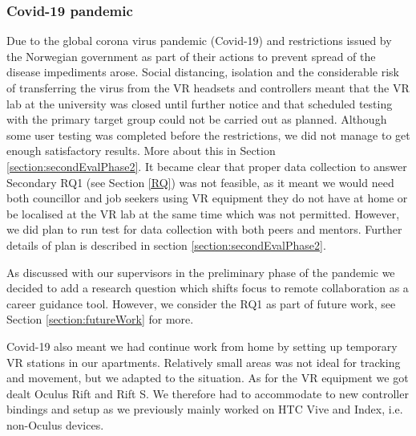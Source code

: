 \subsubsection{Covid-19 pandemic}
\label{section:covid19}
Due to the global corona virus pandemic (Covid-19) and restrictions issued by the Norwegian government as part of their actions to prevent spread of the disease \cite{FhiCorona} impediments arose. Social distancing, isolation and the considerable risk of transferring the virus from the VR headsets and controllers meant that the VR lab at the university was closed until further notice and that scheduled testing with the primary target group could not be carried out as planned. Although some user testing was completed before the restrictions, we did not manage to get enough satisfactory results. More about this in Section \ref{section:secondEvalPhase2}. It became clear that proper data collection to answer Secondary RQ1 (see Section \ref{RQ}) was not feasible, as it meant we would need both councillor and job seekers using VR equipment they do not have at home or be localised at the VR lab at the same time which was not permitted. However, we did plan to run test for data collection with both peers and mentors. Further details of plan is described in section \ref{section:secondEvalPhase2}.

As discussed with our supervisors in the preliminary phase of the pandemic we decided to add a research question which shifts focus to remote collaboration as a career guidance tool. However, we consider the RQ1 as part of future work, see Section \ref{section:futureWork} for more. 

Covid-19 also meant we had continue work from home by setting up temporary VR stations in our apartments. Relatively small areas was not ideal for tracking and movement, but we adapted to the situation. As for the VR equipment we got dealt Oculus Rift and Rift S. We therefore had to accommodate to new controller bindings and setup as we previously mainly worked on HTC Vive and Index, i.e. non-Oculus devices.            





